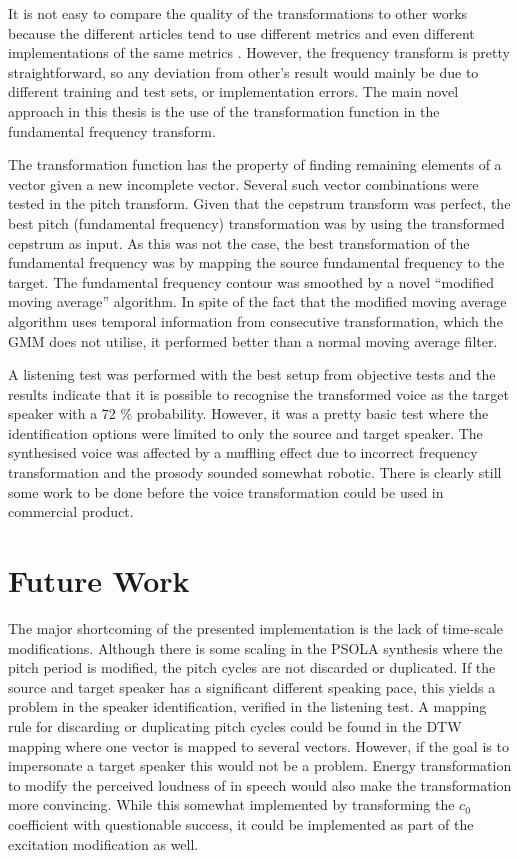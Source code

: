 It is not easy to compare the quality of the transformations to other works because the different articles tend to use different metrics and even different implementations of the same metrics \cite{stylianou98,najjary04,ye06,kim97}. However, the frequency transform is pretty straightforward, so any deviation from other's result would mainly be due to different training and test sets, or implementation errors. The main novel approach in this thesis is the use of the transformation function in the fundamental frequency transform.

The transformation function has the property of finding remaining elements of a vector given a new incomplete vector. Several such vector combinations were tested in the pitch transform. Given that the cepstrum transform was perfect, the best pitch (fundamental frequency) transformation was by using the transformed cepstrum as input. As this was not the case, the best transformation of the fundamental frequency was by mapping the source fundamental frequency to the target. The fundamental frequency contour was smoothed by a novel ``modified moving average'' algorithm. In spite of the fact that the modified moving average algorithm uses temporal information from consecutive transformation, which the GMM does not utilise, it performed better than a normal moving average filter.

A listening test was performed with the best setup from objective tests and the results indicate that it is possible to recognise the transformed voice as the target speaker with a 72 \% probability. However, it was a pretty basic test where the identification options were limited to only the source and target speaker. The synthesised voice was affected by a muffling effect due to incorrect frequency transformation and the prosody sounded somewhat robotic. There is clearly still some work to be done before the voice transformation could be used in commercial product.


\section{Future Work} %
\label{sec:future_work}

The major shortcoming of the presented implementation is the lack of time-scale modifications. Although there is some scaling in the PSOLA synthesis where the pitch period is modified, the pitch cycles are not discarded or duplicated. If the source and target speaker has a significant different speaking pace, this yields a problem in the speaker identification, verified in the listening test. A mapping rule for discarding or duplicating pitch cycles could be found in the DTW mapping where one vector is mapped to several vectors. However, if the goal is to impersonate a target speaker this would not be a problem. Energy transformation to modify the perceived loudness of in speech would also make the transformation more convincing. While this somewhat implemented by transforming the $c_0$ coefficient with questionable success, it could be implemented as part of the excitation modification as well. 


